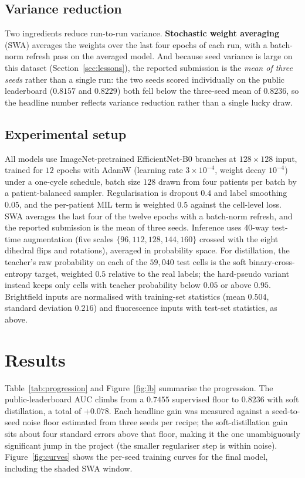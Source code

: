 \documentclass[11pt]{article}
\begin{document}
\subsection{Variance reduction}

Two ingredients reduce run-to-run variance. \textbf{Stochastic weight averaging} (SWA)
\citep{izmailov2018} averages the weights over the last four epochs of each run, with a batch-norm
refresh pass on the averaged model. And because seed variance is large on this dataset
(Section~\ref{sec:lessons}), the reported submission is the \emph{mean of three seeds} rather than a
single run: the two seeds scored individually on the public leaderboard ($0.8157$ and $0.8229$) both
fell below the three-seed mean of $0.8236$, so the headline number reflects variance reduction rather
than a single lucky draw.

\subsection{Experimental setup}

All models use ImageNet-pretrained EfficientNet-B0 branches at $128\times128$ input, trained for $12$
epochs with AdamW (learning rate $3\times10^{-4}$, weight decay $10^{-4}$) under a one-cycle schedule,
batch size $128$ drawn from four patients per batch by a patient-balanced sampler. Regularisation is
dropout $0.4$ and label smoothing $0.05$, and the per-patient MIL term is weighted $0.5$ against the
cell-level loss. SWA averages the last four of the twelve epochs with a batch-norm refresh, and the
reported submission is the mean of three seeds. Inference uses $40$-way test-time augmentation (five
scales $\{96,112,128,144,160\}$ crossed with the eight dihedral flips and rotations), averaged in
probability space. For distillation, the teacher's raw probability on each of the $59{,}040$ test cells
is the soft binary-cross-entropy target, weighted $0.5$ relative to the real labels; the hard-pseudo
variant instead keeps only cells with teacher probability below $0.05$ or above $0.95$. Brightfield
inputs are normalised with training-set statistics (mean $0.504$, standard deviation $0.216$) and
fluorescence inputs with test-set statistics, as above.

\section{Results}

Table~\ref{tab:progression} and Figure~\ref{fig:lb} summarise the progression. The public-leaderboard
AUC climbs from a $0.7455$ supervised floor to $0.8236$ with soft distillation, a total of $+0.078$.
Each headline gain was measured against a seed-to-seed noise floor estimated from three seeds per
recipe; the soft-distillation gain sits about four standard errors above that floor, making it the one
unambiguously significant jump in the project (the smaller regulariser step is within noise).
Figure~\ref{fig:curves} shows the per-seed training curves for the final model, including the shaded SWA
window.
\end{document}
